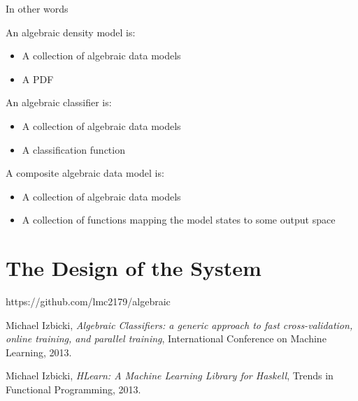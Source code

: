 \documentclass{article}
\begin{document}
In other words

\begin{mydef}
An algebraic density model is:
\begin{itemize}  
    \item A collection of algebraic data models
    \item A PDF
\end{itemize}
\end{mydef}

\begin{mydef}
An algebraic classifier is:
\begin{itemize}  
    \item A collection of algebraic data models
    \item A classification function
\end{itemize}
\end{mydef}


\begin{mydef}
A composite algebraic data model is: 
\begin{itemize}  
    \item A collection of algebraic data models
    \item A collection of functions mapping the model states to some output space
\end{itemize}
\end{mydef}



\section{The Design of the System}

\begin{thebibliography}{9}

  https://github.com/lmc2179/algebraic
  
  Michael Izbicki,
  \emph{Algebraic Classifiers: a generic approach to fast cross-validation, online training, and parallel training},
    International Conference on Machine Learning,
  2013.

  Michael Izbicki,
  \emph{HLearn: A Machine Learning Library for Haskell},
  Trends in Functional Programming,
  2013.



\end{thebibliography}
\end{document}
